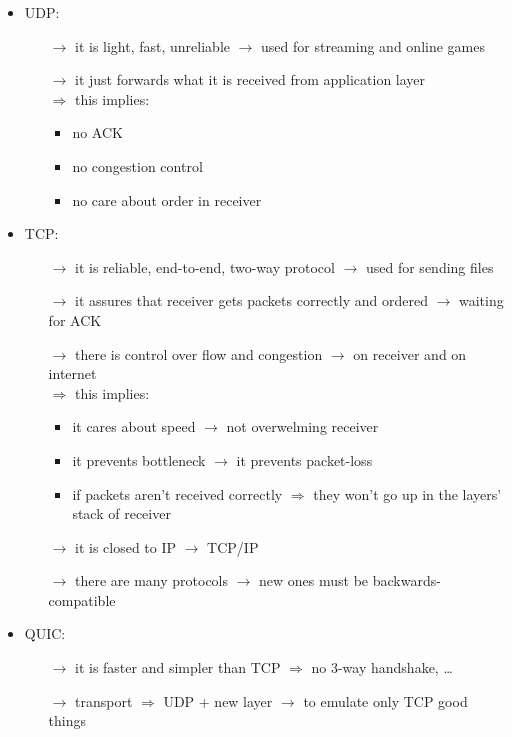 \begin{itemize}
    \item UDP:
    \begin{itemize}
        \item[$\rightarrow$] it is light, fast, unreliable $\rightarrow$ used for streaming and online games
        \item[$\rightarrow$] it just forwards what it is received from application layer\\
        $\Rightarrow$ this implies:
        \begin{itemize}
            \item no ACK
            \item no congestion control
            \item no care about order in receiver
        \end{itemize}
    \end{itemize}
    \item TCP:
    \begin{itemize}
        \item[$\rightarrow$] it is reliable, end-to-end, two-way protocol $\rightarrow$ used for sending files
        \item[$\rightarrow$] it assures that receiver gets packets correctly and ordered $\rightarrow$ waiting for ACK
        \item[$\rightarrow$] there is control over flow and congestion $\rightarrow$ on receiver and on internet\\
        $\Rightarrow$ this implies:
        \begin{itemize}
            \item it cares about speed $\rightarrow$ not overwelming receiver
            \item it prevents bottleneck $\rightarrow$ it prevents packet-loss
            \item if packets aren't received correctly $\Rightarrow$ they won't go up in the layers' stack of receiver 
        \end{itemize}
        \item[$\rightarrow$] it is closed to IP $\rightarrow$ TCP/IP
        \item[$\rightarrow$] there are many protocols $\rightarrow$ new ones must be backwards-compatible
    \end{itemize}
    \item QUIC:
    \begin{itemize}
        \item[$\rightarrow$] it is faster and simpler than TCP $\Rightarrow$ no 3-way handshake, \dots
        \item[$\rightarrow$] transport $\Rightarrow$ UDP + new layer $\rightarrow$ to emulate only TCP good things
    \end{itemize}
\end{itemize}

